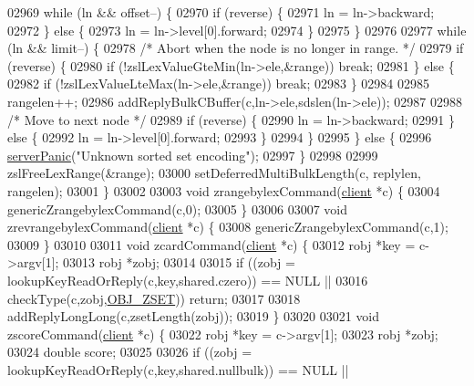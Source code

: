 \begin{DoxyCode}
02969         \textcolor{keywordflow}{while} (ln && offset--) \{
02970             \textcolor{keywordflow}{if} (reverse) \{
02971                 ln = ln->backward;
02972             \} \textcolor{keywordflow}{else} \{
02973                 ln = ln->level[0].forward;
02974             \}
02975         \}
02976 
02977         \textcolor{keywordflow}{while} (ln && limit--) \{
02978             \textcolor{comment}{/* Abort when the node is no longer in range. */}
02979             \textcolor{keywordflow}{if} (reverse) \{
02980                 \textcolor{keywordflow}{if} (!zslLexValueGteMin(ln->ele,&range)) \textcolor{keywordflow}{break};
02981             \} \textcolor{keywordflow}{else} \{
02982                 \textcolor{keywordflow}{if} (!zslLexValueLteMax(ln->ele,&range)) \textcolor{keywordflow}{break};
02983             \}
02984 
02985             rangelen++;
02986             addReplyBulkCBuffer(c,ln->ele,sdslen(ln->ele));
02987 
02988             \textcolor{comment}{/* Move to next node */}
02989             \textcolor{keywordflow}{if} (reverse) \{
02990                 ln = ln->backward;
02991             \} \textcolor{keywordflow}{else} \{
02992                 ln = ln->level[0].forward;
02993             \}
02994         \}
02995     \} \textcolor{keywordflow}{else} \{
02996         \hyperlink{server_8h_a11cc378e7778a830b41240578de3b204}{serverPanic}(\textcolor{stringliteral}{"Unknown sorted set encoding"});
02997     \}
02998 
02999     zslFreeLexRange(&range);
03000     setDeferredMultiBulkLength(c, replylen, rangelen);
03001 \}
03002 
03003 \textcolor{keywordtype}{void} zrangebylexCommand(\hyperlink{structclient}{client} *c) \{
03004     genericZrangebylexCommand(c,0);
03005 \}
03006 
03007 \textcolor{keywordtype}{void} zrevrangebylexCommand(\hyperlink{structclient}{client} *c) \{
03008     genericZrangebylexCommand(c,1);
03009 \}
03010 
03011 \textcolor{keywordtype}{void} zcardCommand(\hyperlink{structclient}{client} *c) \{
03012     robj *key = c->argv[1];
03013     robj *zobj;
03014 
03015     \textcolor{keywordflow}{if} ((zobj = lookupKeyReadOrReply(c,key,shared.czero)) == NULL ||
03016         checkType(c,zobj,\hyperlink{server_8h_a8c356422ddbc03bd77694880a30a1953}{OBJ\_ZSET})) \textcolor{keywordflow}{return};
03017 
03018     addReplyLongLong(c,zsetLength(zobj));
03019 \}
03020 
03021 \textcolor{keywordtype}{void} zscoreCommand(\hyperlink{structclient}{client} *c) \{
03022     robj *key = c->argv[1];
03023     robj *zobj;
03024     \textcolor{keywordtype}{double} score;
03025 
03026     \textcolor{keywordflow}{if} ((zobj = lookupKeyReadOrReply(c,key,shared.nullbulk)) == NULL ||

\end{DoxyCode}
